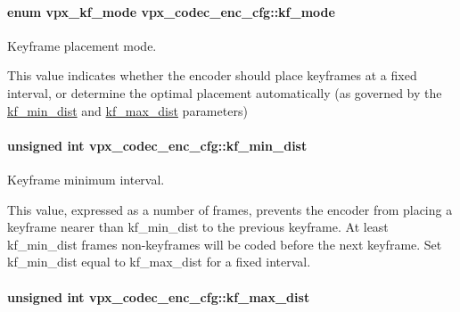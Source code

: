 \paragraph[{\texorpdfstring{kf\+\_\+mode}{kf_mode}}]{\setlength{\rightskip}{0pt plus 5cm}enum {\bf vpx\+\_\+kf\+\_\+mode} vpx\+\_\+codec\+\_\+enc\+\_\+cfg\+::kf\+\_\+mode}\hypertarget{structvpx__codec__enc__cfg_a491d67f061dcdb13f60c017563e9d788}{}\label{structvpx__codec__enc__cfg_a491d67f061dcdb13f60c017563e9d788}


Keyframe placement mode. 

This value indicates whether the encoder should place keyframes at a fixed interval, or determine the optimal placement automatically (as governed by the \hyperlink{structvpx__codec__enc__cfg_a0a7b5444ecb09745cbe8d5af17553846}{kf\+\_\+min\+\_\+dist} and \hyperlink{structvpx__codec__enc__cfg_ae018440136e271743376730413d25a9b}{kf\+\_\+max\+\_\+dist} parameters) 
\paragraph[{\texorpdfstring{kf\+\_\+min\+\_\+dist}{kf_min_dist}}]{\setlength{\rightskip}{0pt plus 5cm}unsigned int vpx\+\_\+codec\+\_\+enc\+\_\+cfg\+::kf\+\_\+min\+\_\+dist}\hypertarget{structvpx__codec__enc__cfg_a0a7b5444ecb09745cbe8d5af17553846}{}\label{structvpx__codec__enc__cfg_a0a7b5444ecb09745cbe8d5af17553846}


Keyframe minimum interval. 

This value, expressed as a number of frames, prevents the encoder from placing a keyframe nearer than kf\+\_\+min\+\_\+dist to the previous keyframe. At least kf\+\_\+min\+\_\+dist frames non-\/keyframes will be coded before the next keyframe. Set kf\+\_\+min\+\_\+dist equal to kf\+\_\+max\+\_\+dist for a fixed interval. 
\paragraph[{\texorpdfstring{kf\+\_\+max\+\_\+dist}{kf_max_dist}}]{\setlength{\rightskip}{0pt plus 5cm}unsigned int vpx\+\_\+codec\+\_\+enc\+\_\+cfg\+::kf\+\_\+max\+\_\+dist}\hypertarget{structvpx__codec__enc__cfg_ae018440136e271743376730413d25a9b}{}\label{structvpx__codec__enc__cfg_ae018440136e271743376730413d25a9b}


